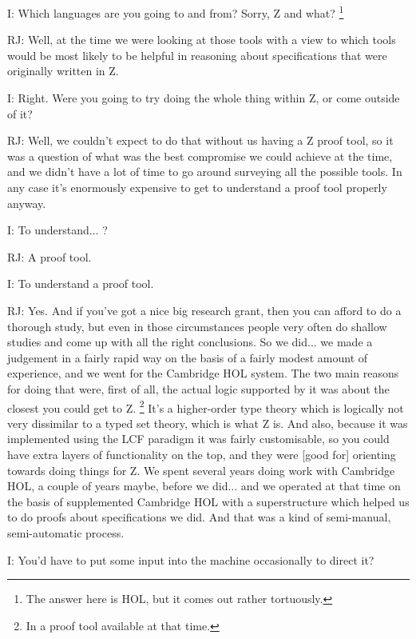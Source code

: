\documentclass[10pt,titlepage]{book}
\begin{document}
I: Which languages are you going to and from?
Sorry, Z and what?%
\footnote{The answer here is HOL, but it comes out rather tortuously.}%

RJ: Well, at the time we were looking at those tools with a view to which tools would be most likely to be helpful in reasoning about specifications that were originally written in Z.

I: Right.
Were you going to try doing the whole thing within Z, or come outside of it?

RJ: Well, we couldn't expect to do that without us having a Z proof tool, so it was a question of what was the best compromise we could achieve at the time, and we didn't have a lot of time to go around surveying all the possible tools.
In any case it's enormously expensive to get to understand a proof tool properly anyway.

I: To understand... ?

RJ: A proof tool.

I: To understand a proof tool.

RJ: Yes.
And if you've got a nice big research grant, then you can afford to do a thorough study, but even in those circumstances people very often do shallow studies and come up with all the right conclusions.
So we did... we made a judgement in a fairly rapid way on the basis of a fairly modest amount of experience, and we went for the Cambridge HOL system.
The two main reasons for doing that were, first of all, the actual logic supported by it was about the closest you could get to Z.%
\footnote{In a proof tool available at that time.}%
It's a higher-order type theory which is logically not very dissimilar to a typed set theory, which is what Z is.
And also, because it was implemented using the LCF paradigm it was fairly customisable, so you could have extra layers of functionality on the top, and they were [good for] orienting towards doing things for Z.
We spent several years doing work with Cambridge HOL, a couple of years maybe, before we did... and we operated at that time on the basis of supplemented Cambridge HOL with a superstructure which helped us to do proofs about specifications we did. And that was a kind of semi-manual, semi-automatic process.

I: You'd have to put some input into the machine occasionally to direct it?
\end{document}
